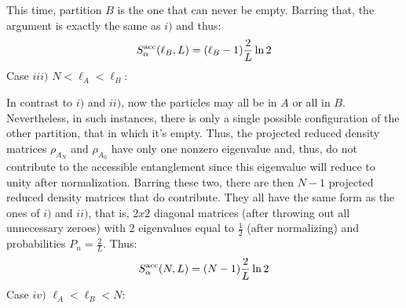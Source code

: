 This time, partition $B$ is the one that can never be empty. Barring that, the argument is exactly the same as $i)$ and thus:
%
\begin{equation}
S_{\alpha}^{\rm acc} (\ell_{B}, L) = (\ell_{B} - 1) \frac{2}{L} \ln{2}
\end{equation}
%
Case $iii)$ $N < \ell_{A} < \ell_{B}$:

In contrast to $i)$ and $ii)$, now the particles may all be in $A$ or all in $B$. Nevertheless, in such instances, there is only a single possible configuration of the other partition, that in which it's empty. Thus, the projected reduced density matrices $\rho_{A_N}$ and $\rho_{A_0}$ have only one nonzero eigenvalue and, thus, do not contribute to the accessible entanglement since this eigenvalue will reduce to unity after normalization. Barring these two, there are then $N-1$ projected reduced density matrices that do contribute. They all have the same form as the ones of $i)$ and $ii)$, that is, $2x2$ diagonal matrices (after throwing out all unnecessary zeroes) with 2 eigenvalues equal to $\frac{1}{2}$ (after normalizing) and probabilities $P_n = \frac{2}{L}$. Thus:
%
\begin{equation}
S_{\alpha}^{\rm acc} (N, L) = (N - 1) \frac{2}{L} \ln{2}
\end{equation}
%
Case $iv)$ $\ell_{A} < \ell_{B} < N$:

